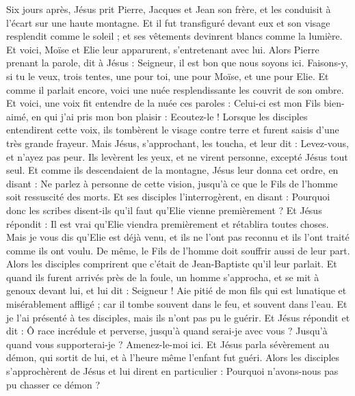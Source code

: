 \begin{multicols}{2}
\VerseOne{}Six jours après, Jésus prit Pierre, Jacques et Jean son frère, et les conduisit à l'écart sur une haute montagne.
Et il fut transfiguré devant eux et son visage resplendit comme le soleil ; et ses vêtements devinrent blancs comme la lumière.
Et voici, Moïse et Elie leur apparurent, s'entretenant avec lui.
Alors Pierre prenant la parole, dit à Jésus : Seigneur, il est bon que nous soyons ici. Faisons-y, si tu le veux, trois tentes, une pour toi, une pour Moïse, et une pour Elie.
Et comme il parlait encore, voici une nuée resplendissante les couvrit de son ombre. Et voici, une voix fit entendre de la nuée ces paroles : Celui-ci est mon Fils bien-aimé, en qui j'ai pris mon bon plaisir : Ecoutez-le !
Lorsque les disciples entendirent cette voix, ils tombèrent le visage contre terre et furent saisis d’une très grande frayeur.
Mais Jésus, s'approchant, les toucha, et leur dit : Levez-vous, et n'ayez pas peur.
Ils levèrent les yeux, et ne virent personne, excepté Jésus tout seul.
Et comme ils descendaient de la montagne, Jésus leur donna cet ordre, en disant : Ne parlez à personne de cette vision, jusqu'à ce que le Fils de l'homme soit ressuscité des morts.
Et ses disciples l'interrogèrent, en disant : Pourquoi donc les scribes disent-ils qu'il faut qu'Elie vienne premièrement ?
Et Jésus répondit : Il est vrai qu'Elie viendra premièrement et rétablira toutes choses.
Mais je vous dis qu'Elie est déjà venu, et ils ne l'ont pas reconnu et ils l’ont traité comme ils ont voulu. De même, le Fils de l'homme doit souffrir aussi de leur part.
Alors les disciples comprirent que c'était de Jean-Baptiste qu'il leur parlait.
Et quand ils furent arrivés près de la foule, un homme s'approcha, et se mit à genoux devant lui,
et lui dit : Seigneur ! Aie pitié de mon fils qui est lunatique et misérablement affligé ; car il tombe souvent dans le feu, et souvent dans l'eau.
Et je l'ai présenté à tes disciples, mais ils n’ont pas pu le guérir.
Et Jésus répondit et dit : Ô race incrédule et perverse, jusqu’à quand serai-je avec vous ? Jusqu’à quand vous supporterai-je ? Amenez-le-moi ici.
Et Jésus parla sévèrement au démon, qui sortit de lui, et à l'heure même l'enfant fut guéri.
Alors les disciples s’approchèrent de Jésus et lui dirent en particulier : Pourquoi n’avons-nous pas pu chasser ce démon ?

\end{multicols}
